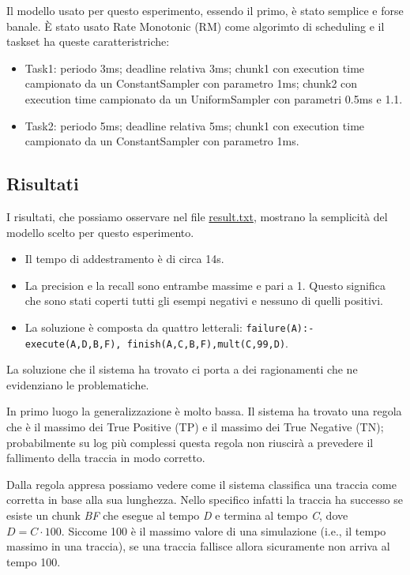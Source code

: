 \myskip

Il modello usato per questo esperimento, essendo il primo, è stato semplice e forse banale. È stato usato Rate Monotonic (RM) come algorimto di scheduling e il taskset ha queste caratteristriche:
\begin{itemize}
    \item Task1: periodo 3ms; deadline relativa 3ms; chunk1 con execution time campionato da un ConstantSampler con parametro 1ms; chunk2 con execution time campionato da un UniformSampler con parametri 0.5ms e 1.1.
    \item Task2: periodo 5ms; deadline relativa 5ms; chunk1 con execution time campionato da un ConstantSampler con parametro 1ms.
\end{itemize}

\subsection{Risultati}
I risultati, che possiamo osservare nel file \href{https://github.com/edoardosarri24/numsynth/tree/main/my-experiments/1-start/result.txt}{result.txt}, mostrano la semplicità del modello scelto per questo esperimento.
\begin{itemize}
    \item Il tempo di addestramento è di circa 14s.
    \item La precision e la recall sono entrambe massime e pari a 1. Questo significa che sono stati coperti tutti gli esempi negativi e nessuno di quelli positivi.
    \item La soluzione è composta da quattro letterali: \texttt{failure(A):-execute(A,D,B,F), \allowbreak finish(A,C,B,F),mult(C,99,D)}.
\end{itemize}

\myskip

La soluzione che il sistema ha trovato ci porta a dei ragionamenti che ne evidenziano le problematiche.

In primo luogo la generalizzazione è molto bassa. Il sistema ha trovato una regola che è il massimo dei True Positive (TP) e il massimo dei True Negative (TN); probabilmente su log più complessi questa regola non riuscirà a prevedere il fallimento della traccia in modo corretto.

Dalla regola appresa possiamo vedere come il sistema classifica una traccia come corretta in base alla sua lunghezza. Nello specifico infatti la traccia ha successo se esiste un chunk \textit{BF} che esegue al tempo \textit{D} e termina al tempo \textit{C}, dove $D=C\cdot100$. Siccome 100 è il massimo valore di una simulazione (i.e., il tempo massimo in una traccia), se una traccia fallisce allora sicuramente non arriva al tempo 100.

